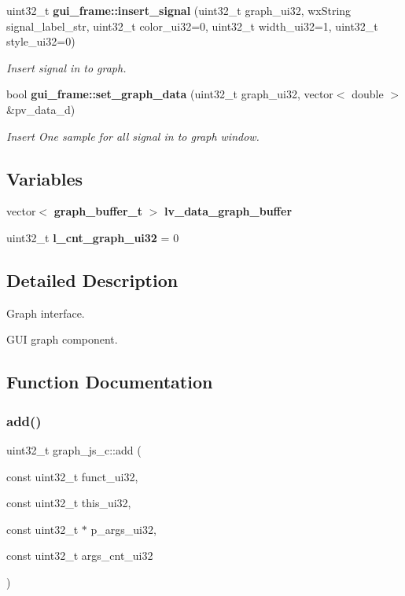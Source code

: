 \begin{DoxyCompactItemize}
uint32\+\_\+t \textbf{ gui\+\_\+frame\+::insert\+\_\+signal} (uint32\+\_\+t graph\+\_\+ui32, wx\+String signal\+\_\+label\+\_\+str, uint32\+\_\+t color\+\_\+ui32=0, uint32\+\_\+t width\+\_\+ui32=1, uint32\+\_\+t style\+\_\+ui32=0)
\begin{DoxyCompactList}\small\item\em Insert signal in to graph. \end{DoxyCompactList}\item 
bool \textbf{ gui\+\_\+frame\+::set\+\_\+graph\+\_\+data} (uint32\+\_\+t graph\+\_\+ui32, vector$<$ double $>$ \&pv\+\_\+data\+\_\+d)
\begin{DoxyCompactList}\small\item\em Insert One sample for all signal in to graph window. \end{DoxyCompactList}\end{DoxyCompactItemize}
\subsection*{Variables}
\begin{DoxyCompactItemize}
\item 
vector$<$ \textbf{ graph\+\_\+buffer\+\_\+t} $>$ \textbf{ lv\+\_\+data\+\_\+graph\+\_\+buffer}
\item 
\mbox{\label{group___graph_ga13361911adaa361953384d128f6a8048}} 
uint32\+\_\+t {\bfseries l\+\_\+cnt\+\_\+graph\+\_\+ui32} = 0
\end{DoxyCompactItemize}


\subsection{Detailed Description}
Graph interface. 

G\+UI graph component.

\subsection{Function Documentation}
\mbox{\label{group___graph_ga4f89da10b241f5a9f265d78c67507368}} 
\subsubsection{add()}
{\footnotesize\ttfamily uint32\+\_\+t graph\+\_\+js\+\_\+c\+::add (\begin{DoxyParamCaption}\item[{const uint32\+\_\+t}]{funct\+\_\+ui32,  }\item[{const uint32\+\_\+t}]{this\+\_\+ui32,  }\item[{const uint32\+\_\+t $\ast$}]{p\+\_\+args\+\_\+ui32,  }\item[{const uint32\+\_\+t}]{args\+\_\+cnt\+\_\+ui32 }\end{DoxyParamCaption})\hspace{0.3cm}{\ttfamily [static]}}



